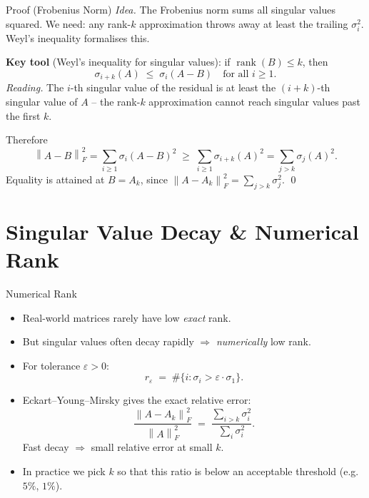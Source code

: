 \documentclass[10pt,aspectratio=169]{beamer}
\DeclareMathOperator{\rank}{rank}
\newcommand{\norm}[1]{\left\|#1\right\|}
\begin{document}
\begin{frame}{Proof (Frobenius Norm)}
  \emph{Idea.} The Frobenius norm sums all singular values squared. We need: any rank-$k$ approximation throws away at least the trailing $\sigma_i^2$. Weyl's inequality formalises this.

  \medskip
  \textbf{Key tool} (Weyl's inequality for singular values): if $\rank(B) \leq k$, then
  \[
    \sigma_{i+k}(A) \;\leq\; \sigma_i(A - B) \quad \text{for all } i \geq 1.
  \]
  \emph{Reading.} The $i$-th singular value of the residual is at least the $(i+k)$-th singular value of $A$ -- the rank-$k$ approximation cannot reach singular values past the first $k$.

  \medskip
  Therefore
  \[
    \norm{A - B}_F^2 = \sum_{i \geq 1} \sigma_i(A-B)^2 \;\geq\; \sum_{i \geq 1} \sigma_{i+k}(A)^2 = \sum_{j > k} \sigma_j(A)^2.
  \]
  Equality is attained at $B = A_k$, since $\norm{A - A_k}_F^2 = \sum_{j > k} \sigma_j^2$. \qed
\end{frame}

\section{Singular Value Decay \& Numerical Rank}

\begin{frame}{Numerical Rank}
  \begin{itemize}
    \item Real-world matrices rarely have low \emph{exact} rank.
    \item But singular values often decay rapidly $\Rightarrow$ \emph{numerically} low rank.
    \item For tolerance $\varepsilon > 0$:
      \[
        r_\varepsilon \;=\; \#\{ i : \sigma_i > \varepsilon \cdot \sigma_1 \}.
      \]
    \item Eckart--Young--Mirsky gives the exact relative error:
      \[
        \frac{\norm{A - A_k}_F^2}{\norm{A}_F^2} \;=\; \frac{\sum_{i>k}\sigma_i^2}{\sum_i \sigma_i^2}.
      \]
      Fast decay $\Rightarrow$ small relative error at small $k$.
    \item In practice we pick $k$ so that this ratio is below an acceptable threshold (e.g.\ $5\%$, $1\%$).
  \end{itemize}
\end{frame}
\end{document}
